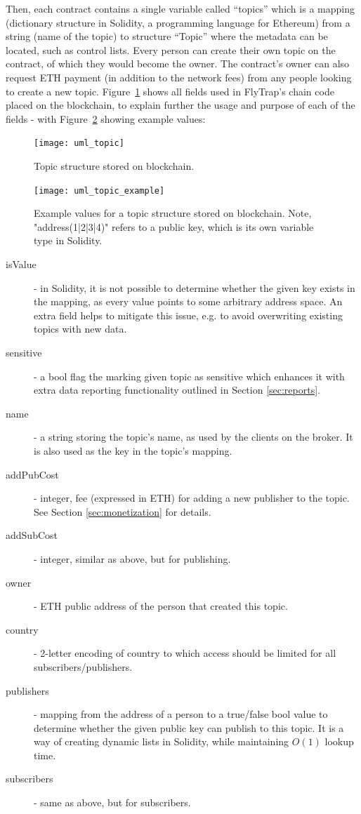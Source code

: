 Then, each contract contains a single variable called ``topics'' which is a mapping (dictionary structure in Solidity, a programming language for Ethereum) from a string (name of the topic) to structure ``Topic'' where the metadata can be located, such as control lists. Every person can create their own topic on the contract, of which they would become the owner. The contract's owner can also request ETH payment (in addition to the network fees) from any people looking to create a new topic. Figure~\ref{fig:uml_topic} shows all fields used in FlyTrap's chain code placed on the blockchain, to explain further the usage and purpose of each of the fields - with Figure~\ref{fig:uml_topic_example} showing example values:

\begin{figure}[h]
    \centering
    \texttt{[image: uml\_topic]}
    \caption{Topic structure stored on blockchain.}
    \label{fig:uml_topic}
\end{figure}
\begin{figure}[h]
    \centering
    \texttt{[image: uml\_topic\_example]}
    \caption{Example values for a topic structure stored on blockchain. Note, "address(1|2|3|4)" refers to a public key, which is its own variable type in Solidity.}
    \label{fig:uml_topic_example}
\end{figure}

\begin{description}
    \item[isValue] - in Solidity, it is not possible to determine whether the given key exists in the mapping, as every value points to some arbitrary address space. An extra field helps to mitigate this issue, e.g. to avoid overwriting existing topics with new data.
    \item[sensitive] - a bool flag the marking given topic as sensitive which enhances it with extra data reporting functionality outlined in Section \ref{sec:reports}.
    \item[name] - a string storing the topic's name, as used by the clients on the broker. It is also used as the key in the topic's mapping.
    \item[addPubCost] - integer, fee (expressed in ETH) for adding a new publisher to the topic. See Section \ref{sec:monetization} for details.
    \item[addSubCost] - integer, similar as above, but for publishing.
    \item[owner] - ETH public address of the person that created this topic.
    \item[country] - 2-letter encoding of country to which access should be limited for all subscribers/publishers.
    \item[publishers] - mapping from the address of a person to a true/false bool value to determine whether the given public key can publish to this topic. It is a way of creating dynamic lists in Solidity, while maintaining $O(1)$ lookup time.
    \item[subscribers] - same as above, but for subscribers.
\end{description}

